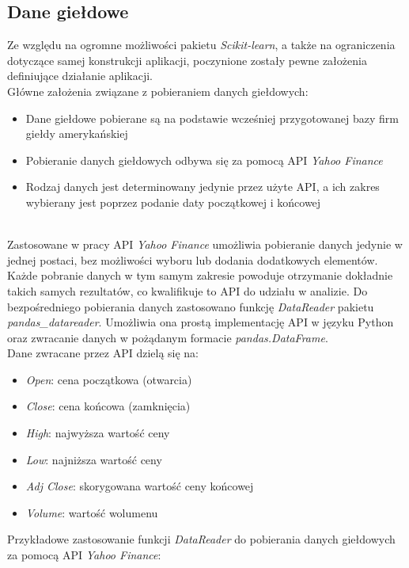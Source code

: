 \subsection{Dane giełdowe}

Ze względu na ogromne możliwości pakietu \textit{Scikit-learn}, a także na ograniczenia dotyczące samej konstrukcji aplikacji, poczynione zostały pewne założenia definiujące działanie aplikacji.\\
Główne założenia związane z pobieraniem danych giełdowych:
\begin{itemize}
 \item Dane giełdowe pobierane są na podstawie wcześniej przygotowanej bazy firm giełdy amerykańskiej
 \item Pobieranie danych giełdowych odbywa się za pomocą API \textit{Yahoo Finance}
 \item Rodzaj danych jest determinowany jedynie przez użyte API, a ich zakres wybierany jest poprzez podanie daty początkowej i końcowej
\end{itemize}\\

Zastosowane w pracy API \textit{Yahoo Finance} umożliwia pobieranie danych jedynie w jednej postaci, bez możliwości wyboru lub dodania dodatkowych elementów.
Każde pobranie danych w tym samym zakresie powoduje otrzymanie dokładnie takich samych rezultatów, co kwalifikuje to API do udziału w analizie.
Do bezpośredniego pobierania danych zastosowano funkcję \textit{DataReader} pakietu \textit{pandas\_datareader}.
Umożliwia ona prostą implementację API w języku Python oraz zwracanie danych w pożądanym formacie \textit{pandas.DataFrame}.\\
Dane zwracane przez API dzielą się na:
\begin{itemize}
 \item \textit{Open}: cena początkowa (otwarcia)
 \item \textit{Close}: cena końcowa (zamknięcia) 
 \item \textit{High}: najwyższa wartość ceny 
 \item \textit{Low}: najniższa wartość ceny 
 \item \textit{Adj Close}: skorygowana wartość ceny końcowej
 \item \textit{Volume}: wartość wolumenu
\end{itemize}

Przykładowe zastosowanie funkcji \textit{DataReader} do pobierania danych giełdowych za pomocą API \textit{Yahoo Finance}:

